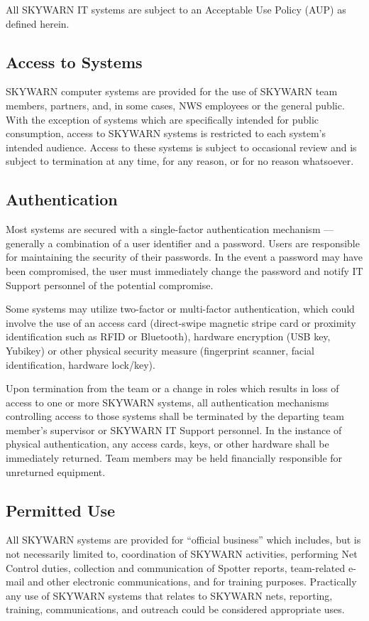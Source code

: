 \documentclass[pdflatex,letterpaper,twoside,12pt]{book}
\begin{document}
All SKYWARN IT systems are subject to an Acceptable Use Policy (AUP) as defined herein.

\subsection{Access to Systems}
SKYWARN computer systems are provided for the use of SKYWARN team members, partners, and, in some cases, NWS employees or the general public.   With the exception of systems which are specifically intended for public consumption, access to SKYWARN systems is restricted to each system's intended audience.  Access to these systems is subject to occasional review and is subject to termination at any time, for any reason, or for no reason whatsoever.

\subsection{Authentication}

Most systems are secured with a single-factor authentication mechanism –-- generally a combination of a user identifier and a password.  Users are responsible for maintaining the security of their passwords.  In the event a password may have been compromised, the user must immediately change the password and notify IT Support personnel of the potential compromise.

Some systems may utilize two-factor or multi-factor authentication, which could involve the use of an access card (direct-swipe magnetic stripe card or proximity identification such as RFID or Bluetooth), hardware encryption (USB key, Yubikey) or other physical security measure (fingerprint scanner, facial identification, hardware lock/key).

Upon termination from the team or a change in roles which results in loss of access to one or more SKYWARN systems, all authentication mechanisms controlling access to those systems shall be terminated by the departing team member's supervisor or SKYWARN IT Support personnel.  In the instance of physical authentication, any access cards, keys, or other hardware shall be immediately returned.  Team members may be held financially responsible for unreturned equipment.

\subsection{Permitted Use}

All SKYWARN systems are provided for ``official business'' which includes, but is not necessarily limited to, coordination of SKYWARN activities, performing Net Control duties, collection and communication of Spotter reports, team-related e-mail and other electronic communications, and for training purposes.  Practically any use of SKYWARN systems that relates to SKYWARN nets, reporting, training, communications, and outreach could be considered appropriate uses.
\end{document}
